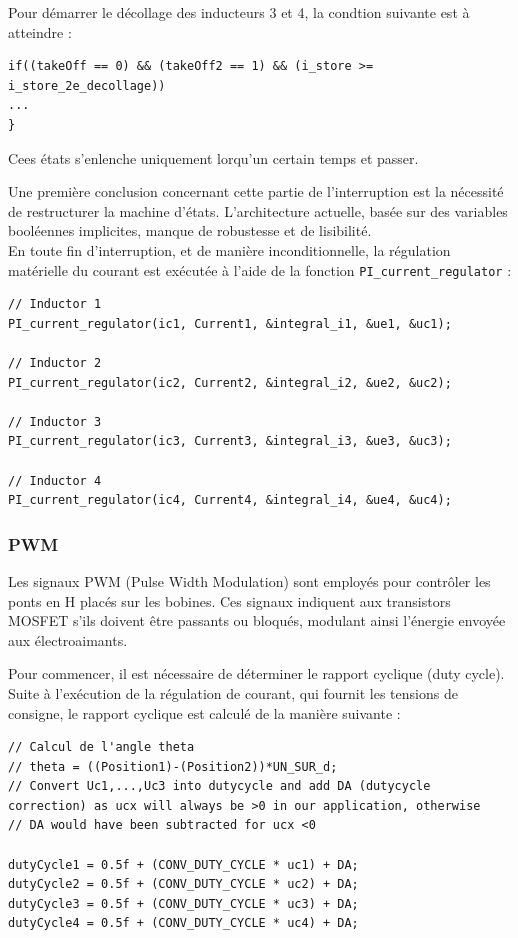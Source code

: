Pour démarrer le décollage des inducteurs 3 et 4, la condtion suivante est à atteindre :

\begin{verbatim}
if((takeOff == 0) && (takeOff2 == 1) && (i_store >= i_store_2e_decollage))
...
}
\end{verbatim}

Cees états s'enlenche uniquement lorqu'un certain temps et passer.

Une première conclusion concernant cette partie de l'interruption est la nécessité de restructurer la machine d'états. L'architecture actuelle, basée sur des variables booléennes implicites, manque de robustesse et de lisibilité.\\

En toute fin d'interruption, et de manière inconditionnelle, la régulation matérielle du courant est exécutée à l'aide de la fonction \texttt{PI\_current\_regulator} :

\begin{verbatim}
// Inductor 1
PI_current_regulator(ic1, Current1, &integral_i1, &ue1, &uc1);

// Inductor 2
PI_current_regulator(ic2, Current2, &integral_i2, &ue2, &uc2);

// Inductor 3
PI_current_regulator(ic3, Current3, &integral_i3, &ue3, &uc3);

// Inductor 4
PI_current_regulator(ic4, Current4, &integral_i4, &ue4, &uc4);
\end{verbatim}

\subsubsection{PWM}
Les signaux PWM (Pulse Width Modulation) sont employés pour contrôler les ponts en H placés sur les bobines. Ces signaux indiquent aux transistors MOSFET s'ils doivent être passants ou bloqués, modulant ainsi l'énergie envoyée aux électroaimants.

Pour commencer, il est nécessaire de déterminer le rapport cyclique (duty cycle). Suite à l'exécution de la régulation de courant, qui fournit les tensions de consigne, le rapport cyclique est calculé de la manière suivante :

\begin{verbatim}
// Calcul de l'angle theta
// theta = ((Position1)-(Position2))*UN_SUR_d;
// Convert Uc1,...,Uc3 into dutycycle and add DA (dutycycle correction) as ucx will always be >0 in our application, otherwise
// DA would have been subtracted for ucx <0

dutyCycle1 = 0.5f + (CONV_DUTY_CYCLE * uc1) + DA;
dutyCycle2 = 0.5f + (CONV_DUTY_CYCLE * uc2) + DA;
dutyCycle3 = 0.5f + (CONV_DUTY_CYCLE * uc3) + DA;
dutyCycle4 = 0.5f + (CONV_DUTY_CYCLE * uc4) + DA;
\end{verbatim}

